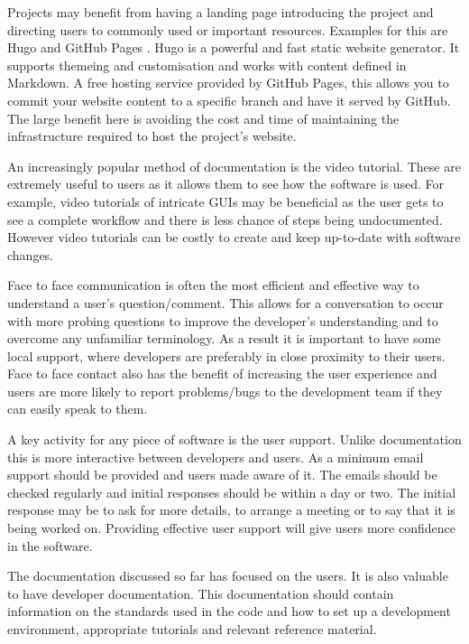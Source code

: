 \documentclass[jnr]{iosart2x}
\begin{document}
Projects may benefit from having a landing page introducing the project and directing users to commonly used or important resources.
Examples for this are Hugo \cite{Hugo} and GitHub Pages \cite{GitHub_Pages}.
Hugo is a powerful and fast static website generator.
It supports themeing and customisation and works with content defined in Markdown.
A free hosting service provided by GitHub Pages, this allows you to commit your website content to a specific branch and have it served by GitHub.
The large benefit here is avoiding the cost and time of maintaining the infrastructure required to host the project's website.

An increasingly popular method of documentation is the video tutorial.
These are extremely useful to users as it allows them to see how the software is used.
For example, video tutorials of intricate GUIs may be beneficial as the user gets to see a complete workflow and there is less chance of steps being undocumented.
However video tutorials can be costly to create and keep up-to-date with software changes.

Face to face communication is often the most efficient and effective way to understand a user's question/comment.
This allows for a conversation to occur with more probing questions to improve the developer's understanding and to overcome any unfamiliar terminology.
As a result it is important to have some local support, where developers are preferably in close proximity to their users.
Face to face contact also has the benefit of increasing the user experience and users are more likely to report problems/bugs to the development team if they can easily speak to them.

A key activity for any piece of software is the user support.
Unlike documentation this is more interactive between developers and users.
As a minimum email support should be provided and users made aware of it.
The emails should be checked regularly and initial responses should be within a day or two.
The initial response may be to ask for more details, to arrange a meeting or to say that it is being worked on.
Providing effective user support will give users more confidence in the software.

The documentation discussed so far has focused on the users.
It is also valuable to have developer documentation.
This documentation should contain information on the standards used in the code and how to set up a development environment, appropriate tutorials and relevant reference material.
\end{document}
